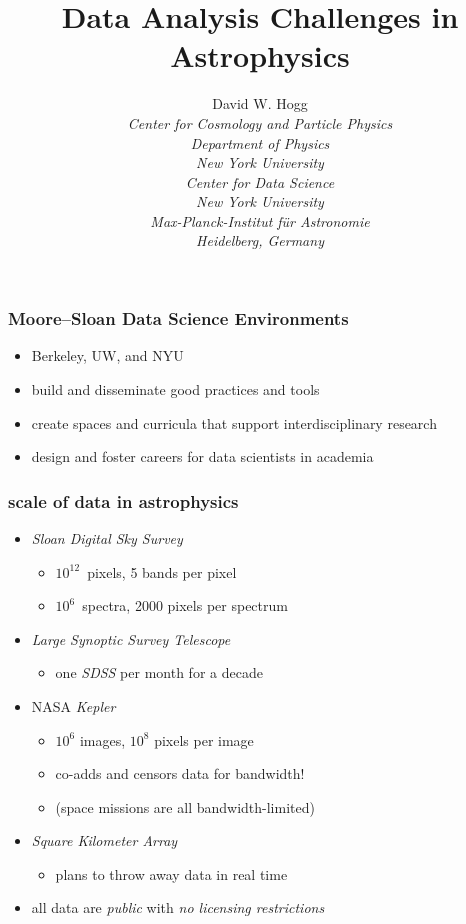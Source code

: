 \documentclass[pdftex]{beamer}
\title{Data Analysis Challenges in Astrophysics}
\author[David W. Hogg (NYU)]{David W. Hogg \\[1ex]
  \textsl{\small Center for Cosmology and Particle Physics\\
                 Department of Physics\\
                 New York University\\[2ex]
                 Center for Data Science\\
                 New York University\\[2ex]
                 Max-Planck-Institut f\"ur Astronomie\\
                 Heidelberg, Germany}}
\begin{document}
\begin{frame}
  \titlepage
\end{frame}

\begin{frame}
  \frametitle{Moore--Sloan Data Science Environments}
  \begin{itemize}
  \item Berkeley, UW, and NYU
  \item build and disseminate good practices and tools
  \item create spaces and curricula that support interdisciplinary research
  \item design and foster careers for data scientists in academia
  \end{itemize}
\end{frame}

\begin{frame}
  \frametitle{scale of data in astrophysics}
  \begin{itemize}
  \item \textsl{Sloan Digital Sky Survey}
    \begin{itemize}
    \item $10^{12}$~pixels, 5 bands per pixel
    \item $10^6$~spectra, 2000 pixels per spectrum
    \end{itemize}
  \item \textsl{Large Synoptic Survey Telescope}
    \begin{itemize}
    \item one \textsl{SDSS} per month for a decade
    \end{itemize}
  \item NASA \textsl{Kepler}
    \begin{itemize}
    \item $10^6$ images, $10^8$ pixels per image
    \item co-adds and censors data for bandwidth!
    \item (space missions are all bandwidth-limited)
    \end{itemize}
  \item \textsl{Square Kilometer Array}
    \begin{itemize}
    \item plans to throw away data in real time
    \end{itemize}
  \item all data are \emph{public} with \emph{no licensing restrictions}
  \end{itemize}
\end{frame}
\end{document}

